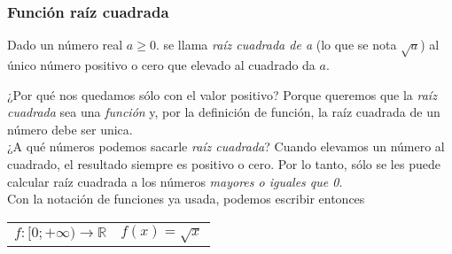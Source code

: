 \documentclass[Análisis.root.tex]{subfiles}
\newcommand{\R}{\mathbb{R}}
\begin{document}
        \subsubsection{Función raíz cuadrada}
        Dado un número real \(a\geq0\). se llama \textit{raíz cuadrada de a} (lo que se nota \(\sqrt{a}\)) al único número positivo o cero que elevado al cuadrado da \(a\).
        \begin{center}
        \end{center}
        ¿Por qué nos quedamos sólo con el valor positivo? Porque queremos que la \textit{raíz cuadrada} sea una \textit{función} y, por la definición de función, la raíz cuadrada de un número debe ser unica.\\
        ¿A qué números podemos sacarle \textit{raíz cuadrada}? Cuando elevamos un número al cuadrado, el resultado siempre es positivo o cero. Por lo tanto, sólo se les puede calcular raíz cuadrada a los números \textit{mayores o iguales que 0}.\\
        Con la notación de funciones ya usada, podemos escribir entonces
        \begin{center}
            \begin{tabularx}{.6\textwidth}{XX}
                \centering\(f:[0;+\infty)\rightarrow\R\) & \centering\(f(x)=\sqrt{x}\)
            \end{tabularx}
        \end{center}
\end{document}
